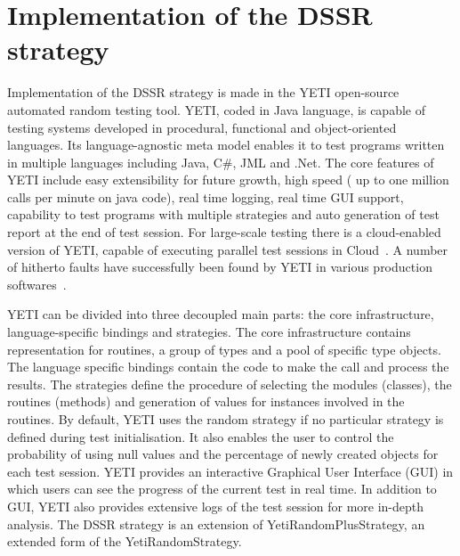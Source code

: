 \documentclass[conference]{IEEEtran}
\begin{document}


\section{Implementation of the DSSR \\ strategy}\label{sec:imp}

Implementation of the DSSR strategy is made in the YETI open-source automated random testing tool. YETI, coded in Java language, is capable of testing systems developed in procedural, functional and object-oriented languages. Its language-agnostic meta model enables it to test programs written in multiple languages including Java, C\#, JML and .Net. The core features of YETI include easy extensibility for future growth, high speed ( up to one million calls per minute on java code), real time logging, real time GUI support, capability to test programs with multiple strategies and auto generation of test report at the end of test session. For large-scale testing there is a cloud-enabled version of YETI, capable of executing parallel test sessions in Cloud~\cite{Oriol2010}. A number of hitherto faults have successfully been found by YETI in various production softwares~\cite{Oriol2011, Oriol2012}.

YETI can be divided into three decoupled main parts: the core infrastructure, language-specific bindings and strategies. The core infrastructure contains representation for routines, a group of types and a pool of specific type objects. The language specific bindings contain the code to make the call and process the results. The strategies define the procedure of selecting the modules (classes), the routines (methods) and generation of values for instances involved in the routines. By default, YETI uses the random strategy if no particular strategy is defined during test initialisation. It also enables the user to control the probability of using null values and the percentage of newly created objects for each test session. YETI provides an interactive Graphical User Interface (GUI) in which users can see the progress of the current test in real time. In addition to GUI, YETI also provides extensive logs of the test session for more in-depth analysis. The DSSR strategy is an extension of YetiRandomPlusStrategy, an extended form of the YetiRandomStrategy. 


\end{document}
